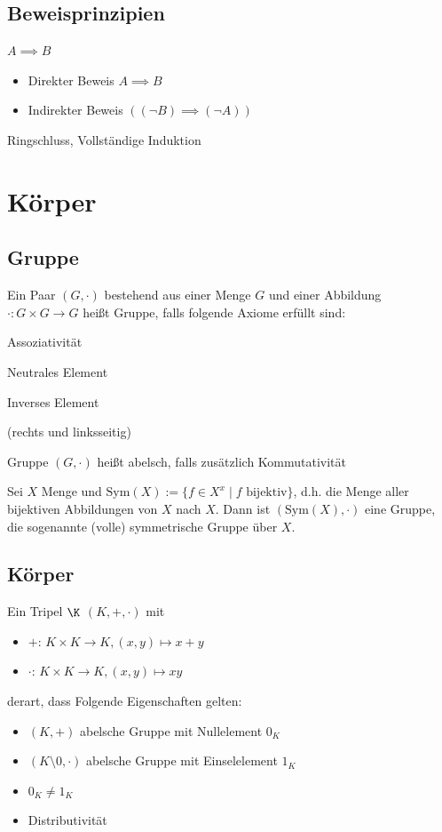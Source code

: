 \subsection{Beweisprinzipien}
$A\implies B$
\begin{itemize}
	\item Direkter Beweis $A\implies B$
	\item Indirekter Beweis $((\neg B)\implies (\neg A))$
\end{itemize}
Ringschluss, Vollständige Induktion
\section{Körper}
\subsection{Gruppe}
\begin{definition}[Gruppe]
	Ein Paar $(G, \cdot)$ bestehend aus einer Menge $G$ und einer Abbildung $\cdot: G\times G\to G$ heißt Gruppe, falls folgende Axiome erfüllt sind:
	\begin{enumerateroman}
	\item Assoziativität
	\item Neutrales Element
	\item Inverses Element
	\end{enumerateroman}
	(rechts und linksseitig)
\end{definition}
\begin{definition}
	Gruppe $(G, \cdot)$ heißt abelsch, falls zusätzlich Kommutativität
\end{definition}
Sei $X$ Menge und $\mathrm{Sym}(X):=\{f\in X^x \mid f \text{ bijektiv}\}$, d.h. die Menge aller bijektiven Abbildungen von $X$ nach $X$. Dann ist $(\mathrm{Sym}(X), \cdot)$ eine Gruppe, die sogenannte (volle) symmetrische Gruppe über $X$. 
\subsection{Körper}
\begin{definition}
	Ein Tripel $\K$ $(K, +, \cdot)$ mit
	\begin{itemize}
		\item $+$: $K\times K\to K, (x,y)\mapsto x+y$
		\item $\cdot$: $K\times K\to K, (x,y)\mapsto xy$
	\end{itemize}
	derart, dass Folgende Eigenschaften gelten:
	\begin{itemize}
		\item $(K,+)$ abelsche Gruppe mit Nullelement $0_{K}$
		\item $(K\setminus 0, \cdot)$ abelsche Gruppe mit Einselelement $1_{K}$
		\item $0_{K}\neq 1_{K}$ 
		\item Distributivität
	\end{itemize}
\end{definition}
